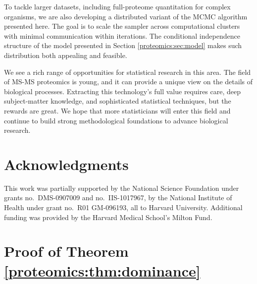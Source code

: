 To tackle larger datasets, including full-proteome quantitation for complex organisms, we are also developing a distributed variant of the MCMC algorithm presented here.
The goal is to scale the sampler across computational clusters with minimal communication within iterations.
The conditional independence structure of the model presented in Section \ref{proteomics:sec:model} makes such distribution both appealing and feasible.

We see a rich range of opportunities for statistical research in this area.
The field of MS-MS proteomics is young, and it can provide a unique view on the details of biological processes.
Extracting this technology's full value requires care, deep subject-matter knowledge, and sophisticated statistical techniques, but the rewards are great.
We hope that more statisticians will enter this field and continue to build strong methodological foundations to advance biological research.


\section{Acknowledgments}

This work was partially supported by the National Science Foundation under grants no.\ DMS-0907009 and no.\ IIS-1017967, by the National Institute of Health under grant no.\ R01 GM-096193, all to Harvard University. Additional funding was provided by the Harvard Medical School's Milton Fund.



\section{Proof of Theorem \ref{proteomics:thm:dominance}}


